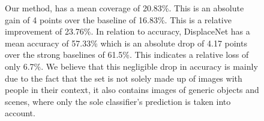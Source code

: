 \documentclass[10pt,twocolumn,letterpaper]{article}
\begin{document}
\begin{figure}[t!]
Our method, has a mean coverage of 20.83\%. This is an absolute gain of 4 points over the baseline of 16.83\%. This is a relative improvement of 23.76\%. In relation to accuracy, DisplaceNet has a mean accuracy of 57.33\% which is an absolute drop of 4.17 points over the strong baselines of 61.5\%. This indicates a relative loss of only 6.7\%. We believe that this negligible drop in accuracy is mainly due to the fact that the  set is not solely made up of images with people in their context, it also contains images of generic objects and scenes, where only the sole classifier's prediction is taken into account.


\begin{table}[t!]
	\centering
\end{table}
\end{figure}
\end{document}
